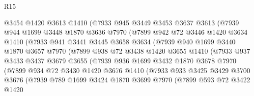 \begin{lexlean}{R15}
\begin{coremodule}
              @3454
              @1420
              @3613
              @1410
              (@7933
                @945
                @3449
                @3453
                @3637
                @3613
                (@7939
                  @944
                  @1699
                  @3448
                  @1870
                  @3636
                  @7970
                  (@7899
                    @942
                    @72
                    @3446
                    @1420
                    @3634
                    @1410
                    (@7933
                      @941
                      @3441
                      @3445
                      @3658
                      @3634
                      (@7939
                        @940
                        @1699
                        @3440
                        @1870
                        @3657
                        @7970
                        (@7899
                          @938
                          @72
                          @3438
                          @1420
                          @3655
                          @1410
                          (@7933
                            @937
                            @3433
                            @3437
                            @3679
                            @3655
                            (@7939
                              @936
                              @1699
                              @3432
                              @1870
                              @3678
                              @7970
                              (@7899
                                @934
                                @72
                                @3430
                                @1420
                                @3676
                                @1410
                                (@7933
                                  @933
                                  @3425
                                  @3429
                                  @3700
                                  @3676
                                  (@7939
                                    @789
                                    @1699
                                    @3424
                                    @1870
                                    @3699
                                    @7970
                                    (@7899
                                      @593
                                      @72
                                      @3422
                                      @1420

\end{coremodule}
\end{lexlean}
